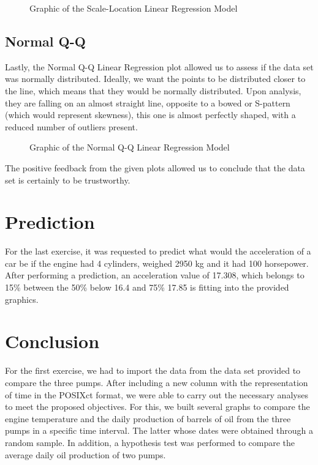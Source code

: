 \documentclass[conference]{IEEEtran}
\begin{document}
\begin{figure}[H]
    \caption{Graphic of the Scale-Location Linear Regression Model}
    \label{scaleLocation}
\end{figure}

\subsection{Normal Q-Q}

Lastly, the Normal Q-Q Linear Regression plot allowed us to assess if the data set was normally distributed.
Ideally, we want the points to be distributed closer to the line, which means that they would be normally distributed. 
Upon analysis, they are falling on an almost straight line, opposite to a bowed or S-pattern (which would represent skewness), this one is almost perfectly shaped, 
with a reduced number of outliers present.

\begin{figure}[H]
    \caption{Graphic of the Normal Q-Q Linear Regression Model}
    \label{normalQQ}
\end{figure}

The positive feedback from the given plots allowed us to conclude that the data set is certainly to be trustworthy.

\section{Prediction}

For the last exercise, it was requested to predict what would the acceleration of a car be if the engine had 4 cylinders, weighed 2950 kg and it had 100 horsepower. 
After performing a prediction, an acceleration value of 17.308, which belongs to 15\% 
between the 50\% below 16.4 and 75\% 17.85 is fitting into the provided graphics.

\section{Conclusion}

For the first exercise, we had to import the data from the data set provided to compare the three pumps.
After including a new column with the representation of time in the POSIXct format, we were able to carry out the necessary analyses to meet the proposed objectives. For this, we built several graphs to compare the engine temperature and the daily production of barrels of oil from the three pumps in a specific time interval. The latter whose dates were obtained through a random sample.
In addition, a hypothesis test was performed to compare the average daily oil production of two pumps.\\
\end{document}
